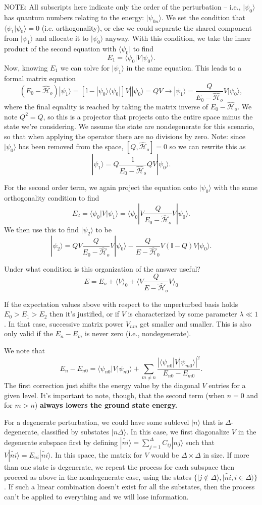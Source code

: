\documentclass[fontsize=12pt]{scrartcl}
\newcommand{\bb}[1]{\mathbb{#1}}
\newcommand{\Id}{\bb{I}}
\newcommand{\la}{\langle}
\newcommand{\ra}{\rangle}
\newcommand{\Ham}{\hat{\mathcal{H}}}
\begin{document}
NOTE: All subscripts here indicate only the order of the perturbation -- i.e., $|\psi_0\ra$ has quantum numbers relating to the energy: $|\psi_{0n}\ra$. We set the condition that $\la \psi_1|\psi_0\ra=0$ (i.e. orthogonality), or else we could separate the shared component from $|\psi_1\ra$ and allocate it to $|\psi_0\ra$ anyway. With this condition, we take the inner product of the second equation with $\la \psi_0|$ to find $$E_1=\la\psi_0|V|\psi_0\ra.$$ Now, knowing $E_1$ we  can solve for $|\psi_1\ra$ in the same equation. This leads to a formal matrix equation $$(E_0-\Ham_o)|\psi_1\ra = \left[\Id - |\psi_0\ra\la \psi_0|\right]V||\psi_0\ra= QV \to |\psi_1\ra = \frac{Q}{E_0-\Ham_o}V|\psi_0\ra,$$ where the final equality is reached by taking the matrix inverse of $E_0-\Ham_o$. We note $Q^2=Q$, so this is a projector that projects onto the entire space minus the state we're considering. We assume the state are nondegenerate for this scenario, so that when applying the operator there are no divisions by zero. Note: since $|\psi_0\ra$ has been removed from the space, $[Q,\Ham_o]=0$ so we can rewrite this as $$|\psi_1\ra = Q\frac{1}{E_0-\Ham_o}QV|\psi_0\ra.$$

For the second order term, we again project the equation onto $|\psi_0\ra$ with the same orthogonality condition to find $$E_2=\la\psi_0|V|\psi_1\ra = \la \psi_0|V\frac{Q}{E_0-\Ham_o}V|\psi_0\ra.$$ We then use this to find $|\psi_2\ra$ to be $$|\psi_2\ra = QV\frac{Q}{E_0-\Ham_o}V|\psi_0\ra - \frac{Q}{E-\Ham_0}V(\Id-Q)V|\psi_0\ra.$$

Under what condition is this organization of the answer useful? $$E=E_o+\la V\ra_0 + \la V\frac{Q}{E-\Ham_o}V\ra_0$$

If the expectation values above with respect to the unperturbed basis holds $E_0>E_1>E_2$ then it's justified, or if $V$ is characterized by some parameter $\lambda\ll1$. In that case, successive matrix power $V_{nm}$ get smaller and smaller. This is also only valid if the $E_n-E_m$ is never zero (i.e., nondegenerate).

We note that $$E_n-E_{n0}=\la\psi_{n0}|V|\psi_{n0}\ra + \sum_{m\neq n} \frac{|\la \psi_{n0}|V|\psi_{m0}\ra|^2}{E_{n0}-E_{m0}}.$$ The first correction just shifts the energy value by the diagonal $V$ entries for a given level. It's important to note, though, that the second term (when $n=0$ and for $m>n$) \textbf{always lowers the ground state energy.}

For a degenerate perturbation, we could have some sublevel $|n\ra$ that is $\Delta$-degenerate, classified by substates $|n\Delta\ra$. In this case, we first diagonalize $V$ in the degenerate subspace first by defining $|\tilde{ni}\ra=\sum_{j=1}^\Delta C_{ij}|nj\ra$ such that $V|\tilde{ni}\ra = E_{ni}|\tilde{ni}\ra.$ In this space, the matrix for $V$ would be $\Delta\times\Delta$ in size. If more than one state is degenerate, we repeat the process for each subspace then proceed as above in the nondegenerate case, using the states $\{|j\notin \Delta\ra, |\tilde{ni}, i\in\Delta\ra\}$. If such a linear combination doesn't exist for all the substates, then the process can't be applied to everything and we will lose information.
\end{document}
